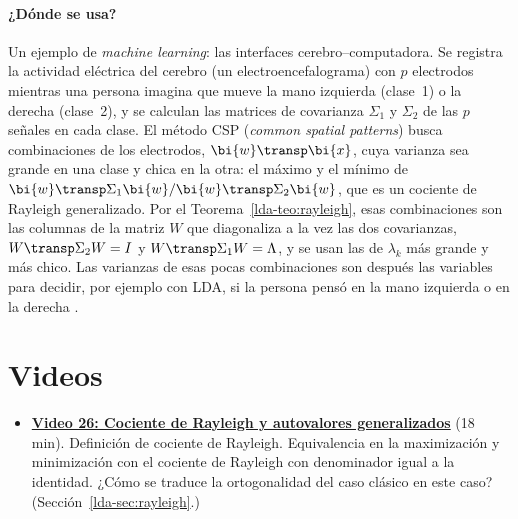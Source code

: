\paragraph{¿Dónde se usa?} Un ejemplo de \emph{machine learning}: las
interfaces cerebro--computadora. Se registra la actividad eléctrica del cerebro
(un electroencefalograma) con $p$ electrodos mientras una persona imagina que
mueve la mano izquierda (clase~1) o la derecha (clase~2), y se calculan las
matrices de covarianza $\Sigma_1$ y $\Sigma_2$ de las $p$ señales en cada clase.
El método CSP (\emph{common spatial patterns}) busca combinaciones de los
electrodos, $\bi{w}\transp \bi{x}$, cuya varianza sea grande en una clase y chica en la
otra: el máximo y el mínimo de $\bi{w}\transp\Sigma_1\bi{w}/\bi{w}\transp\Sigma_2\bi{w}$, que es un
cociente de Rayleigh generalizado. Por el Teorema~\ref{lda-teo:rayleigh}, esas
combinaciones son las columnas de la matriz $W$ que diagonaliza a la vez las
dos covarianzas, $W\transp\Sigma_2W=I$ y $W\transp\Sigma_1W=\Lambda$, y se usan
las de $\lambda_k$ más grande y más chico. Las varianzas de esas pocas
combinaciones son después las variables para decidir, por ejemplo con LDA, si
la persona pensó en la mano izquierda o en la derecha \cite{BTLKM2008}.

\section*{Videos}
\begin{itemize}
\item \href{https://youtu.be/HgtUtNUQ4tk}{\textbf{Video 26: Cociente de Rayleigh y autovalores generalizados}} (18 min).
Definición de cociente de Rayleigh. Equivalencia en la maximización y
minimización con el cociente de Rayleigh con denominador igual a la
identidad. ¿Cómo se traduce la ortogonalidad del caso clásico en este caso?
(Sección~\ref{lda-sec:rayleigh}.)
\end{itemize}

